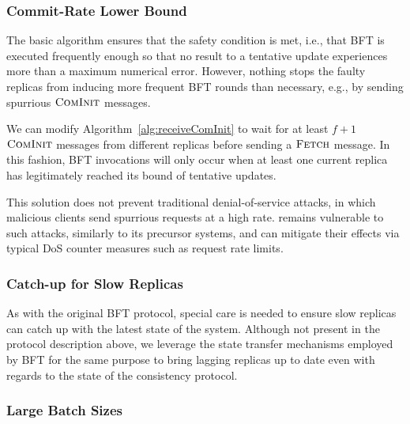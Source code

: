 \documentclass[twocolumn,10pt]{article}
\begin{document}
{\subsubsection{Commit-Rate Lower Bound}

The basic algorithm ensures that the safety condition is met, i.e., that
BFT is executed frequently enough so that no result to a tentative
update experiences more than a maximum numerical error.  However,
nothing stops the faulty replicas from inducing more frequent BFT rounds
than necessary, e.g., by sending spurrious $\textsc{ComInit}$ messages.

We can modify Algorithm~\ref{alg:receiveComInit} to wait for at least
$f+1$ $\textsc{ComInit}$ messages from different replicas before sending a
$\textsc{Fetch}$ message.  In this fashion, BFT invocations will only occur
when at least one current replica has legitimately reached its bound of
tentative updates.

This solution does not prevent traditional denial-of-service attacks, in
which malicious clients send spurrious requests at a high rate.
\Sys remains vulnerable to such attacks, similarly to its precursor
systems, and can mitigate their effects via typical DoS counter measures
such as request rate limits.


\subsubsection{Catch-up for Slow Replicas}

As with the original BFT protocol, special care is needed to ensure slow
replicas can catch up with the latest state of the system. Although not
present in the protocol description above, we leverage the state
transfer mechanisms employed by BFT for the same purpose to bring
lagging replicas up to date even with regards to the state of the
consistency protocol.


\subsubsection{Large Batch Sizes}

}
\end{document}
